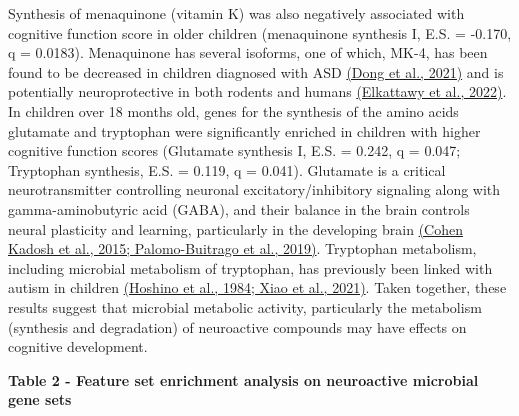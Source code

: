 \documentclass[
]{article}
\begin{document}
Synthesis of menaquinone (vitamin K) was also negatively associated with
cognitive function score in older children (menaquinone synthesis I,
E.S. = -0.170, q = 0.0183). Menaquinone has several isoforms, one of
which, MK-4, has been found to be decreased in children diagnosed with
ASD \href{https://www.zotero.org/google-docs/?dTA3NO}{(Dong et al.,
2021)} and is potentially neuroprotective in both rodents and humans
\href{https://paperpile.com/c/dPbU4e/cTO9}{(Elkattawy et al., 2022)}. In
children over 18 months old, genes for the synthesis of the amino acids
glutamate and tryptophan were significantly enriched in children with
higher cognitive function scores (Glutamate synthesis I, E.S. = 0.242, q
= 0.047; Tryptophan synthesis, E.S. = 0.119, q = 0.041). Glutamate is a
critical neurotransmitter controlling neuronal excitatory/inhibitory
signaling along with gamma-aminobutyric acid (GABA), and their balance
in the brain controls neural plasticity and learning, particularly in
the developing brain
\href{https://www.zotero.org/google-docs/?QubMhx}{(Cohen Kadosh et al.,
2015; Palomo-Buitrago et al., 2019)}. Tryptophan metabolism, including
microbial metabolism of tryptophan, has previously been linked with
autism in children
\href{https://www.zotero.org/google-docs/?GPaUZE}{(Hoshino et al., 1984;
Xiao et al., 2021)}. Taken together, these results suggest that
microbial metabolic activity, particularly the metabolism (synthesis and
degradation) of neuroactive compounds may have effects on cognitive
development.

\textbf{Table 2 - Feature set enrichment analysis on neuroactive
microbial gene sets}
\end{document}

